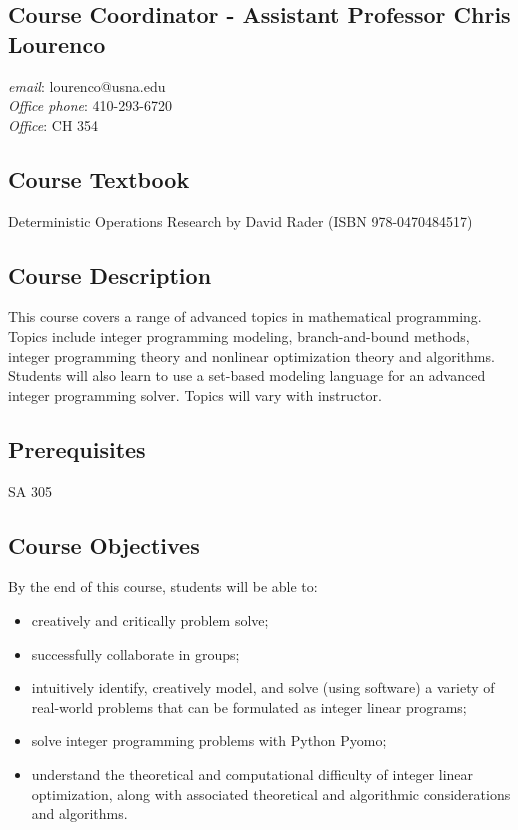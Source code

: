 \documentclass[letterpaper,hidelinks,oneside,11pt]{article}%
\begin{document}
\noindent{}
\subsection*{Course Coordinator - Assistant Professor Chris Lourenco} 
\textit{email}: lourenco@usna.edu \\
\textit{Office phone}: 410-293-6720 \\
\textit{Office}: CH 354


\subsection*{Course Textbook}
Deterministic Operations Research by David Rader (ISBN  978-0470484517)


\subsection*{Course Description}

This course covers a range of advanced topics in mathematical programming. Topics include integer programming modeling, branch-and-bound methods, integer programming theory and nonlinear optimization theory and algorithms. Students will also learn to use a set-based modeling language for an advanced integer programming solver. Topics will vary with instructor.

\subsection*{Prerequisites}

SA 305

\subsection*{Course Objectives}

By the end of this course, students will be able to:
\begin{itemize}
\item creatively and critically problem solve;
\item successfully collaborate in groups;
\item intuitively identify, creatively model, and solve (using software) a variety of real-world
problems that can be formulated as integer linear programs;
\item solve integer programming problems with Python Pyomo;
\item understand the theoretical and computational difficulty of integer linear optimization,
along with associated theoretical and algorithmic considerations and algorithms.
\end{itemize}
\end{document}
